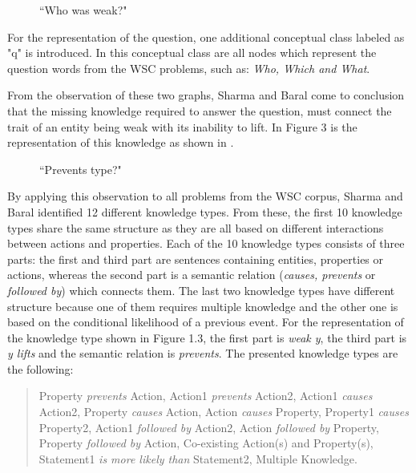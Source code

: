 \begin{figure}
	\centering
	
	\caption{\label{Graph12}``Who was weak?"}
\end{figure}

For the representation of the question, one additional conceptual class labeled as "q" is introduced. In this conceptual class are all nodes which represent the question words from the WSC problems, such as: \textit{Who, Which and What}.

From the observation of these two graphs, Sharma and Baral \cite{2018CommonsenseKT} come to conclusion that the missing knowledge required to answer the question, must connect the trait of an entity being weak with its inability to lift. In Figure 3 is the representation of this knowledge as shown in \cite{2018CommonsenseKT}. 


\begin{figure}
	\centering
	
	\caption{\label{Graph13}``Prevents type?"}
\end{figure}

By applying this observation to all problems from the WSC corpus, Sharma and Baral \cite{2018CommonsenseKT} identified 12 different knowledge types. From these, the first 10 knowledge types share the same structure as they are all based on different interactions between actions and properties. Each of the 10 knowledge types consists of three parts: the first and third part are sentences containing entities, properties or actions, whereas the second part is a semantic relation (\textit{causes, prevents} or \textit{followed by}) which connects them. The last two knowledge types have different structure because one of them requires multiple knowledge and the other one is based on the conditional likelihood of a previous event. 
For the representation of the knowledge type shown in Figure 1.3, the first part is \textit{weak y}, the third part is \textit{y lifts} and the semantic relation is \textit{prevents}.
The presented knowledge types are the following:

\begin{quote} 
	Property \textit{prevents} Action, Action1 \textit{prevents} Action2, Action1 \textit{causes} Action2, Property \textit{causes} Action, Action \textit{causes} Property, Property1 \textit{causes} Property2, Action1 \textit{followed by} Action2, Action \textit{followed by} Property, Property \textit{followed by} Action, Co-existing Action(s) and Property(s), Statement1 \textit{is more likely than} Statement2, Multiple Knowledge. 
\end{quote}


